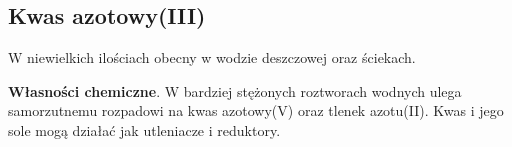 \subsection{Kwas azotowy(III) }
W niewielkich ilościach obecny w wodzie deszczowej oraz ściekach.

\textbf{Własności chemiczne}.
W bardziej stężonych roztworach wodnych ulega samorzutnemu rozpadowi na kwas azotowy(V) oraz tlenek azotu(II).
Kwas i jego sole mogą działać jak utleniacze i reduktory.

